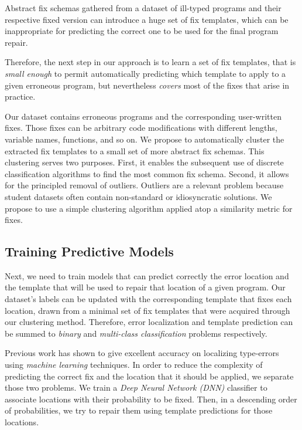 Abstract fix schemas gathered from a dataset of ill-typed 
programs and their respective fixed version can introduce 
a huge set of fix templates, which can be inappropriate 
for predicting the correct one to be used for the final 
program repair. 

Therefore, the next step in our approach is to learn 
a set of fix templates, that is \emph{small enough} to 
permit automatically predicting which template to apply 
to a given erroneous program, but nevertheless \emph{covers}
most of the fixes that arise in practice.


 Our dataset contains erroneous programs and the
corresponding user-written fixes. Those fixes can be arbitrary code
modifications with different lengths, variable names, functions, and so on. We
propose to automatically cluster the extracted fix templates to a small set of
more abstract fix schemas. This clustering serves two purposes. First, it
enables the subsequent use of discrete classification algorithms to find the
most common fix schema. Second, it allows for the principled removal of
outliers. Outliers are a relevant problem because student datasets often contain
non-standard or idiosyncratic solutions. We propose to use a simple clustering
algorithm applied atop a similarity metric for fixes.

\subsection{Training Predictive Models}
\label{sec:overview:predict}

Next, we need to train models that can predict correctly the error location and
the template that will be used to repair that location of a given program. Our
dataset's labels can be updated with the corresponding template that fixes each
location, drawn from a minimal set of fix templates that were acquired through
our clustering method. Therefore, error localization and template prediction can
be summed to \emph{binary} and \emph{multi-class classification} problems
respectively.

 Previous work has shown to give excellent accuracy
on localizing type-errors using \emph{machine learning} techniques. In order to
reduce the complexity of predicting the correct fix and the location that it
should be applied, we separate those two problems. We train a \emph{Deep Neural
Network (DNN)} classifier to associate locations with their probability to be
fixed. Then, in a descending order of probabilities, we try to repair them using
template predictions for those locations.

